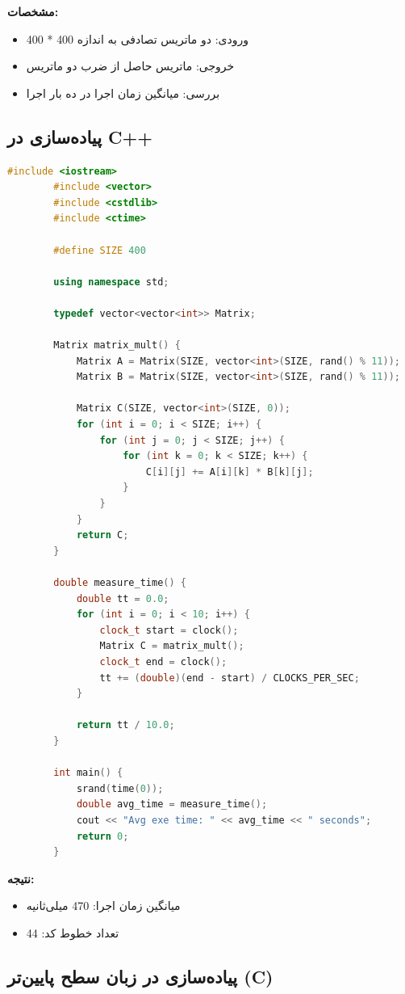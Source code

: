 \documentclass[12pt, a4paper]{report}
\begin{document}
\textbf{مشخصات:}
\begin{itemize}
	\item ورودی: دو ماتریس تصادفی به اندازه 400 * 400
	\item خروجی: ماتریس حاصل از ضرب دو ماتریس
	\item بررسی: میانگین زمان اجرا در ده بار اجرا
\end{itemize}


\subsection{پیاده‌سازی در C++}

\begin{LTR}
	\begin{lstlisting}[language=C++, breaklines=true]
		#include <iostream>
		#include <vector>
		#include <cstdlib>
		#include <ctime>
		
		#define SIZE 400
		
		using namespace std;
		
		typedef vector<vector<int>> Matrix;
		
		Matrix matrix_mult() {
			Matrix A = Matrix(SIZE, vector<int>(SIZE, rand() % 11));
			Matrix B = Matrix(SIZE, vector<int>(SIZE, rand() % 11));
			
			Matrix C(SIZE, vector<int>(SIZE, 0));
			for (int i = 0; i < SIZE; i++) {
				for (int j = 0; j < SIZE; j++) {
					for (int k = 0; k < SIZE; k++) {
						C[i][j] += A[i][k] * B[k][j];
					}
				}
			}
			return C;
		}
		
		double measure_time() {
			double tt = 0.0;
			for (int i = 0; i < 10; i++) {
				clock_t start = clock();
				Matrix C = matrix_mult();
				clock_t end = clock();
				tt += (double)(end - start) / CLOCKS_PER_SEC;
			}
			
			return tt / 10.0;
		}
		
		int main() {
			srand(time(0));
			double avg_time = measure_time();
			cout << "Avg exe time: " << avg_time << " seconds";
			return 0;
		}
	\end{lstlisting}
\end{LTR}

\textbf{نتیجه:}
\begin{itemize}
	\item میانگین زمان اجرا: \textnormal{470} میلی‌ثانیه
	\item تعداد خطوط کد: \textnormal{44}
\end{itemize}

\subsection{پیاده‌سازی در زبان سطح پایین‌تر (C)}
\end{document}
